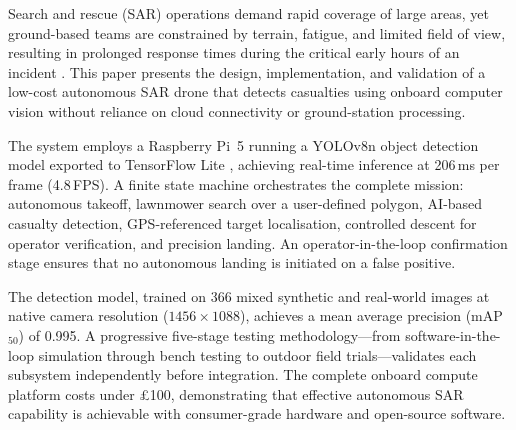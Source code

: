 Search and rescue (SAR) operations demand rapid coverage of large areas, yet ground-based teams are constrained by terrain, fatigue, and limited field of view, resulting in prolonged response times during the critical early hours of an incident \cite{goodrich2008}. This paper presents the design, implementation, and validation of a low-cost autonomous SAR drone that detects casualties using onboard computer vision without reliance on cloud connectivity or ground-station processing.

The system employs a Raspberry Pi~5 running a YOLOv8n object detection model \cite{yolov8} exported to TensorFlow Lite \cite{tflite}, achieving real-time inference at 206\,ms per frame (4.8\,FPS). A finite state machine orchestrates the complete mission: autonomous takeoff, lawnmower search over a user-defined polygon, AI-based casualty detection, GPS-referenced target localisation, controlled descent for operator verification, and precision landing. An operator-in-the-loop confirmation stage ensures that no autonomous landing is initiated on a false positive.

The detection model, trained on 366 mixed synthetic and real-world images at native camera resolution ($1456 \times 1088$), achieves a mean average precision (mAP$_{50}$) of 0.995. A progressive five-stage testing methodology---from software-in-the-loop simulation through bench testing to outdoor field trials---validates each subsystem independently before integration. The complete onboard compute platform costs under \pounds{}100, demonstrating that effective autonomous SAR capability is achievable with consumer-grade hardware and open-source software.
